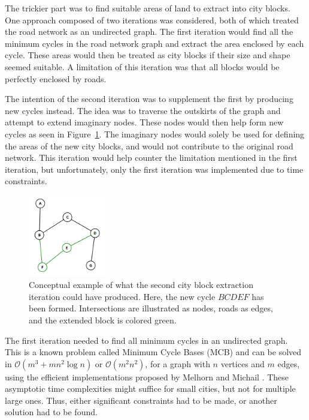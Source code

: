The trickier part was to find suitable areas of land to extract into city blocks.
One approach composed of two iterations was considered, both of which treated the road network as an undirected graph.
The first iteration would find all the minimum cycles in the road network graph and extract the area enclosed by each cycle.
These areas would then be treated as city blocks if their size and shape seemed suitable.
A limitation of this iteration was that all blocks would be perfectly enclosed by roads.

The intention of the second iteration was to supplement the first by producing new cycles instead.
The idea was to traverse the outskirts of the graph and attempt to extend imaginary nodes.
These nodes would then help form new cycles as seen in Figure~\ref{fig:extend_block}.
The imaginary nodes would solely be used for defining the areas of the new city blocks, and would not contribute to the original road network.
This iteration would help counter the limitation mentioned in the first iteration, but unfortunately, only the first iteration was implemented due to time constraints.

\begin{figure}[h!]
  \centering
  \includegraphics[width=0.3\textwidth]{figure/extend_block.png}

  \caption{Conceptual example of what the second city block extraction iteration could have produced. Here, the new cycle $BCDEF$ has been formed. Intersections are illustrated as nodes, roads as edges, and the extended block is colored green.}
  \label{fig:extend_block}
\end{figure}

The first iteration needed to find all minimum cycles in an undirected graph.
This is a known problem called Minimum Cycle Bases (MCB) and can be solved in $\mathcal{O}(m^3 + mn^2 \log n)$ or $\mathcal{O}(m^2n^2)$, for a graph with $n$ vertices and $m$ edges, using the efficient implementations proposed by Melhorn and Michail \cite{mcb_paper}.
These asymptotic time complexities might suffice for small cities, but not for multiple large ones.
Thus, either significant constraints had to be made, or another solution had to be found.

